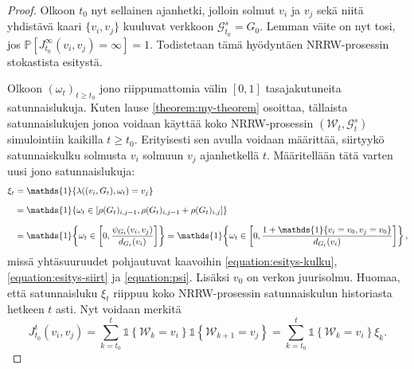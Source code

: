 \documentclass[finnish, 12pt, a4paper, sci, utf8, pdfa]{aaltothesis}
\newcommand{\Grandom}{\mathcal{G}}
\newcommand{\Wrandom}{\mathcal{W}}
\newcommand{\indicator}{\mathopen{\mathds{1}}}
\newcommand*{\prob}{\mathbb{P}}
\begin{document}
\begin{proof}
   Olkoon $ t_{0} $ nyt sellainen ajanhetki, jolloin solmut $ v_{i} $ ja $ v_{j} $ sekä niitä yhdistävä kaari $ \{ v_{i}, v_{j} \} $ kuuluvat verkkoon $ \Grandom_{t_{0}}^{s} = G_{0} $.
   Lemman väite on nyt tosi, jos $ \prob \left[ J_{t_{0}}^{\infty}(v_{i}, v_{j}) = \infty \right] = 1. $ Todistetaan tämä hyödyntäen NRRW-prosessin stokastista esitystä.

   Olkoon $ (\omega_{t})_{t \geq t_{0}} $ jono riippumattomia välin $ [0, 1] $ tasajakutuneita satunnaislukuja. Kuten lause \ref{theorem:my-theorem} osoittaa, tällaista satunnaislukujen
   jonoa voidaan käyttää koko NRRW-prosessin $ (\Wrandom_{t}, \Grandom_{t}^{s}) $ simulointiin kaikilla $ t \geq t_{0} $. Erityisesti sen avulla voidaan määrittää, siirtyykö satunnaiskulku
   solmusta $ v_{i} $ solmuun $ v_{j} $ ajanhetkellä $ t $. Määritellään tätä varten uusi jono satunnaislukuja:
   \begin{equation*}
      \setlength{\jot}{10pt}
      \begin{aligned}
      \xi_{t} &= \indicator \left\{ \lambda((v_{i}, G_{t}), \omega_{t}) = v_{j} \right\} \\
              &= \indicator \left\{ \omega_{t} \in \left[ \rho(G_{t})_{i,j-1}, \rho(G_{t})_{i,j-1} + \rho(G_{t})_{i,j} \right] \right\} \\
              &= \indicator \left\{ \omega_{t} \in \left[ 0, \frac{\psi_{G_{t}}(v_{i}, v_{j})}{d_{G_{t}}(v_{i})} \right] \right\} 
              = \indicator \left\{ \omega_{t} \in \left[ 0, \frac{1 + \indicator \{ v_{i} = v_{0}, v_{j} = v_{0} \}}{d_{G_{t}}(v_{i})} \right] \right\},
      \end{aligned}
   \end{equation*}
   missä yhtäsuuruudet pohjautuvat kaavoihin \ref{equation:esitys-kulku}, \ref{equation:esitys-siirt} ja \ref{equation:psi}. Lisäksi $ v_{0} $ on verkon juurisolmu. Huomaa, että satunnaisluku
   $ \xi_{t} $ riippuu koko NRRW-prosessin satunnaiskulun historiasta hetkeen $ t $ asti. Nyt voidaan merkitä
   \[
      J_{t_{0}}^{t}(v_{i}, v_{j}) = \sum_{k = t_{0}}^{t} \indicator \left\{ \Wrandom_{k} = v_{i} \right\} \indicator \left\{ \Wrandom_{k+1} = v_{j} \right\} 
      = \sum_{k = t_{0}}^{t} \indicator \left\{ \Wrandom_{k} = v_{i} \right\} \xi_{k}.
   \]


\end{proof}
\end{document}
